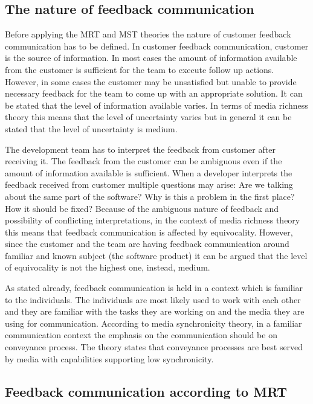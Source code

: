 \documentclass[conference]{IEEEtran}
\begin{document}
\subsection{The nature of feedback communication}

Before applying the MRT and MST theories the nature of customer feedback communication has to be defined. In customer feedback communication, customer is the source of information. In most cases the amount of information available from the customer is sufficient for the team to execute follow up actions. However, in some cases the customer may be unsatisfied but unable to provide necessary feedback for the team to come up with an appropriate solution. It can be stated that the level of information available varies. In terms of media richness theory this means that the level of uncertainty varies but in general it can be stated that the level of uncertainty is medium. 

The development team has to interpret the feedback from customer after receiving it. The feedback from the customer can be ambiguous even if the amount of information available is sufficient. When a developer interprets the feedback received from customer multiple questions may arise: Are we talking about the same part of the software? Why is this a problem in the first place? How it should be fixed? Because of the ambiguous nature of feedback and possibility of conflicting interpretations, in the context of media richness theory this means that feedback communication is affected by equivocality. However, since the customer and the team are having feedback communication around familiar and known subject (the software product) it can be argued that the level of equivocality is not the highest one, instead, medium.

As stated already, feedback communication is held in a context which is familiar to the individuals. The individuals are most likely used to work with each other and they are familiar with the tasks they are working on and the media they are using for communication. According to media synchronicity theory, in a familiar communication context the emphasis on the communication should be on conveyance process. The theory states that conveyance processes are best served by media with capabilities supporting low synchronicity.

\subsection{Feedback communication according to MRT}
\end{document}
